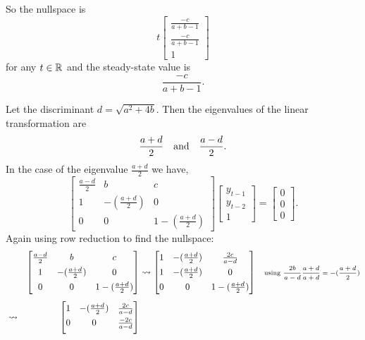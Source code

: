 \documentclass[MathsNotesBase.tex]{subfiles}
\begin{document}
{	  	So the nullspace is
	  	\[ t\begin{bmatrix}
		  		\frac{-c}{a+b-1} \\[4pt] \frac{-c}{a+b-1} \\[4pt] 1	
		  	\end{bmatrix} 
		\]
		for any ${ t \in \mathbb{R}^{} }$ and the steady-state value is
		\[ \frac{-c}{a+b-1}. \]
		
		\bigskip
		Let the discriminant ${ d = \sqrt{a^2 + 4b} }$. Then the eigenvalues of the linear transformation are
		\[ \frac{a + d}{2} \hspace{10pt}\text{and}\hspace{10pt} \frac{a - d}{2}. \]
		In the case of the eigenvalue ${ \frac{a + d}{2} }$ we have,
		\[
		\begin{bmatrix}
			\frac{a - d}{2} &  b & c \\
			1   & -(\frac{a + d}{2}) & 0 \\
			0   &  0 & 1-(\frac{a + d}{2})
		\end{bmatrix}
		\begin{bmatrix}y_{t-1}\\y_{t-2}\\1\end{bmatrix} =
		\begin{bmatrix}0\\0\\0\end{bmatrix}. 
		\]
		Again using row reduction to find the nullspace:
		\begin{align*}
		&& 	\begin{bmatrix}
			\frac{a - d}{2} &  b & c \\[4pt]
			1   & -(\frac{a + d}{2}) & 0 \\[4pt]
			0   &  0 & 1-(\frac{a + d}{2})	
		\end{bmatrix} &\leadsto
		\begin{bmatrix}
			1   & -(\frac{a + d}{2}) & \frac{2c}{a - d} \\[4pt]
			1   & -(\frac{a + d}{2}) & 0 \\[4pt]
			0   &  0 & 1-(\frac{a + d}{2})
		\end{bmatrix} &\text{\scriptsize{using ${ \frac{2b}{a - d}\frac{a + d}{a + d} = -(\frac{a + d}{2}) }$}}\\[4pt]
		&\leadsto & 
		\begin{bmatrix}
			1   & -(\frac{a + d}{2}) & \frac{2c}{a - d} \\[4pt]
			0   &  0 & \frac{-2c}{a - d} \\[4pt]

\end{bmatrix}
\end{align*}}
\end{document}
